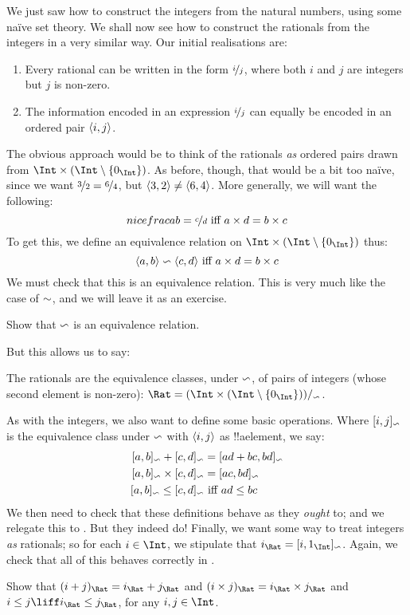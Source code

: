 \documentclass[../../../include/open-logic-section]{subfiles}
\begin{document}

We just saw how to construct the integers from the natural numbers,
using some na\"{i}ve set theory. We shall now see how to construct the
rationals from the integers in a very similar way. Our initial
realisations are:
\begin{enumerate}
	\item Every rational can be written in the form $\nicefrac{i}{j}$,
	where both $i$ and $j$ are integers but $j$ is non-zero.
	\item The information encoded in an expression $\nicefrac{i}{j}$
	can equally be encoded in an ordered pair $\langle  i, j \rangle$.
\end{enumerate}
The obvious approach would be to think of the rationals \emph{as}
ordered pairs drawn from $\Int \times (\Int \setminus \{0_\Int\})$. As
before, though, that would be a bit too na\"ive, since we want
$\nicefrac{3}{2} = \nicefrac{6}{4}$, but $\langle  3, 2 \rangle\neq \langle  6,
4 \rangle$. More generally, we will want the following:
\[
	nicefrac{a}{b} = \nicefrac{c}{d} \text{ iff } a \times d = b \times c
\]
To get this, we define an {equivalence relation} on  $\Int \times
(\Int \setminus \{0_\Int\})$ thus:
\[
	\langle  a, b  \rangle\backsim \langle  c, d \rangle \text{ iff }a \times d = b \times c
\]
We must check that this is an equivalence relation. This is very much
like the case of $\sim$, and we will leave it as an exercise. 

\begin{prob}
Show that $\backsim$ is an equivalence relation.
\end{prob}

But this allows us to say:
\begin{defn}
The rationals are the equivalence classes, under $\backsim$, of pairs
of integers (whose second element is non-zero):  $\Rat =
\equivclass{(\Int \times (\Int\setminus \{0_\Int\}))}{\Ratequiv}$.
\end{defn}

As with the integers, we also want to define some basic operations.
Where $[i,j]_{\backsim}$ is the equivalence class under
$\backsim$ with $\langle  i, j \rangle$ as !!a{element}, we say:
\begin{align*}
	\equivrep{a, b}{\Ratequiv} + \equivrep{c, d}{\Ratequiv} &= \equivrep{ad + bc,  bd}{\Ratequiv}\\
	\equivrep{a, b}{\Ratequiv} \times \equivrep{c, d}{\Ratequiv} &= \equivrep{a  c, b d}{\Ratequiv}\\
	\equivrep{a, b}{\Ratequiv} \leq \equivrep{c, d}{\Ratequiv} &\text{ iff }ad \leq bc
\end{align*}
We then need to check that these definitions behave as they
\emph{ought} to; and we relegate this to . But they
indeed do!{} Finally, we want some way to treat integers \emph{as}
rationals; so for each $i \in \Int$, we stipulate that $i_\Rat =
\equivrep{i, 1_\Int}{\Ratequiv}$. Again, we check that all of this
behaves correctly in .

\begin{prob}
Show that $(i + j)_\Rat = i_\Rat+ j_\Rat$ and $(i \times j)_\Rat =
i_\Rat \times j_\Rat$ and $i \leq j \liff i_\Rat \leq j_\Rat$, for any
$i, j \in \Int$.
\end{prob}
\end{document}

